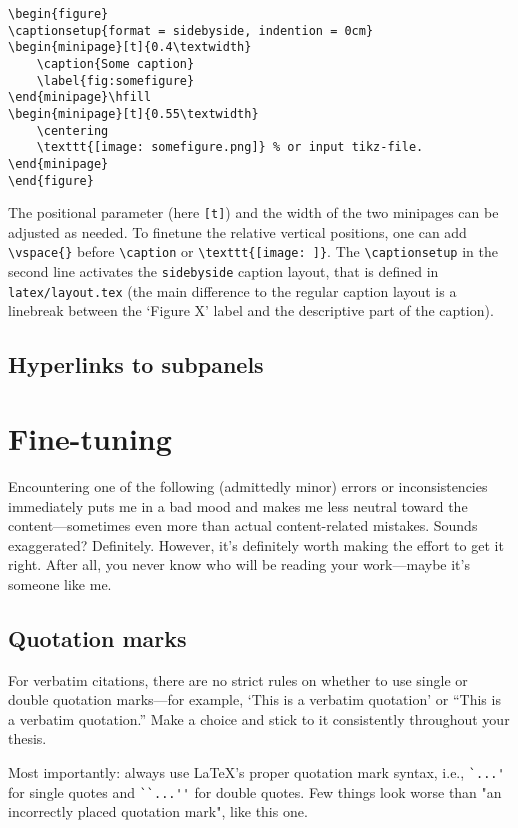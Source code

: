 \begin{lstlisting}
\begin{figure}
\captionsetup{format = sidebyside, indention = 0cm} 
\begin{minipage}[t]{0.4\textwidth}
	\caption{Some caption}
	\label{fig:somefigure}
\end{minipage}\hfill 
\begin{minipage}[t]{0.55\textwidth}
	\centering 
	\texttt{[image: somefigure.png]} % or input tikz-file.
\end{minipage}
\end{figure} 
\end{lstlisting}

The positional parameter (here \verb|[t]|) and the width of the two minipages can be adjusted as needed. To finetune the relative vertical positions, one can add \verb|\vspace{}| before \verb|\caption| or \verb|\texttt{[image: ]}|.
The \verb|\captionsetup| in the second line activates the \verb|sidebyside| caption layout, that is defined in \verb|latex/layout.tex| (the main difference to the regular caption layout is a linebreak between the `Figure X' label and the descriptive part of the caption).


\subsection{Hyperlinks to subpanels}

\section{Fine-tuning}
Encountering one of the following (admittedly minor) errors or inconsistencies immediately puts me in a bad mood and makes me less neutral toward the content---sometimes even more than actual content-related mistakes. Sounds exaggerated? Definitely. However, it's definitely worth making the effort to get it right. After all, you never know who will be reading your work---maybe it’s someone like me.
\subsection{Quotation marks}
For verbatim citations, there are no strict rules on whether to use single or double quotation marks—for example, `This is a verbatim quotation' or ``This is a verbatim quotation.'' Make a choice and stick to it consistently throughout your thesis.

Most importantly: always use LaTeX's proper quotation mark syntax, i.e., \verb|`...'| for single quotes and \verb|``...''| for double quotes. Few things look worse than "an incorrectly placed quotation mark", like this one.

